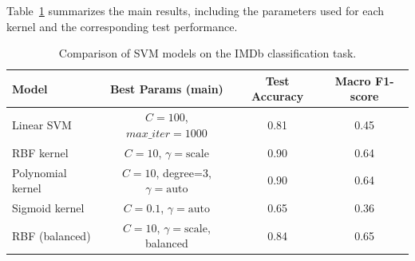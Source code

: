 Table~\ref{tab:svm_results} summarizes the main results, including the parameters used for each kernel and the corresponding test performance. 


\begin{table}[h]
\centering
\caption{Comparison of SVM models on the IMDb classification task.}
\label{tab:svm_results}
\begin{tabular}{lccc}
\hline
\textbf{Model} & \textbf{Best Params (main)} & \textbf{Test Accuracy} & \textbf{Macro F1-score} \\
\hline
Linear SVM & $C=100$, $max\_iter=1000$ & 0.81 & 0.45 \\
RBF kernel & $C=10$, $\gamma=\text{scale}$ & 0.90 & 0.64 \\
Polynomial kernel & $C=10$, degree=3, $\gamma=\text{auto}$ & 0.90 & 0.64 \\
Sigmoid kernel & $C=0.1$, $\gamma=\text{auto}$ & 0.65 & 0.36 \\
RBF (balanced) & $C=10$, $\gamma=\text{scale}$, balanced & 0.84 & 0.65 \\
\hline
\end{tabular}
\end{table}
    
